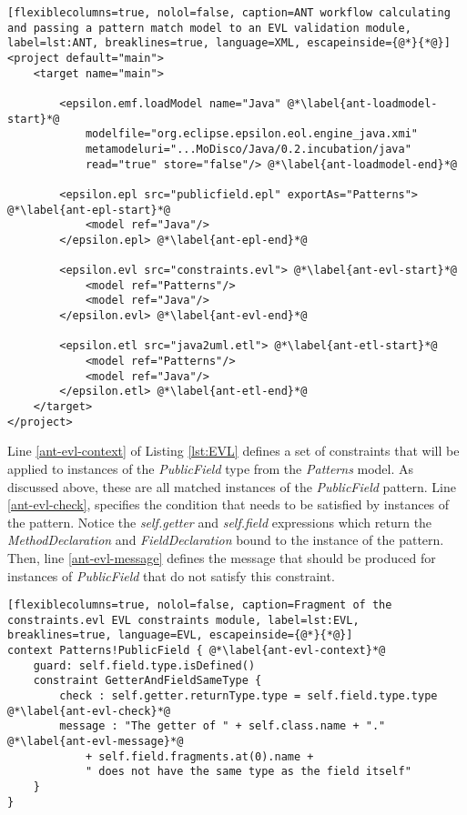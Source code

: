 \begin{lstlisting}[flexiblecolumns=true, nolol=false, caption=ANT workflow calculating and passing a pattern match model to an EVL validation module, label=lst:ANT, breaklines=true, language=XML, escapeinside={@*}{*@}]
<project default="main">
	<target name="main">
	
		<epsilon.emf.loadModel name="Java" @*\label{ant-loadmodel-start}*@
			modelfile="org.eclipse.epsilon.eol.engine_java.xmi" 
			metamodeluri="...MoDisco/Java/0.2.incubation/java"
			read="true" store="false"/> @*\label{ant-loadmodel-end}*@
		
		<epsilon.epl src="publicfield.epl" exportAs="Patterns"> @*\label{ant-epl-start}*@
			<model ref="Java"/>
		</epsilon.epl> @*\label{ant-epl-end}*@
		
		<epsilon.evl src="constraints.evl"> @*\label{ant-evl-start}*@
			<model ref="Patterns"/>
			<model ref="Java"/>
		</epsilon.evl> @*\label{ant-evl-end}*@

		<epsilon.etl src="java2uml.etl"> @*\label{ant-etl-start}*@
			<model ref="Patterns"/>
			<model ref="Java"/>
		</epsilon.etl> @*\label{ant-etl-end}*@
	</target>
</project>
\end{lstlisting}

Line \ref{ant-evl-context} of Listing \ref{lst:EVL} defines a set of constraints that will be applied to instances of the \emph{PublicField} type from the \emph{Patterns} model. As discussed above, these are all matched instances of the \emph{PublicField} pattern. Line \ref{ant-evl-check}, specifies the condition that needs to be satisfied by instances of the pattern. Notice the \emph{self.getter} and \emph{self.field} expressions which return the \emph{MethodDeclaration} and \emph{FieldDeclaration} bound to the instance of the pattern. Then, line \ref{ant-evl-message} defines the message that should be produced for instances of \emph{PublicField} that do not satisfy this constraint.
 
\begin{lstlisting}[flexiblecolumns=true, nolol=false, caption=Fragment of the constraints.evl EVL constraints module, label=lst:EVL, breaklines=true, language=EVL, escapeinside={@*}{*@}]
context Patterns!PublicField { @*\label{ant-evl-context}*@
	guard: self.field.type.isDefined()
	constraint GetterAndFieldSameType { 
		check : self.getter.returnType.type = self.field.type.type @*\label{ant-evl-check}*@
		message : "The getter of " + self.class.name + "." @*\label{ant-evl-message}*@
			+ self.field.fragments.at(0).name +
			" does not have the same type as the field itself"
	}
}
\end{lstlisting}

